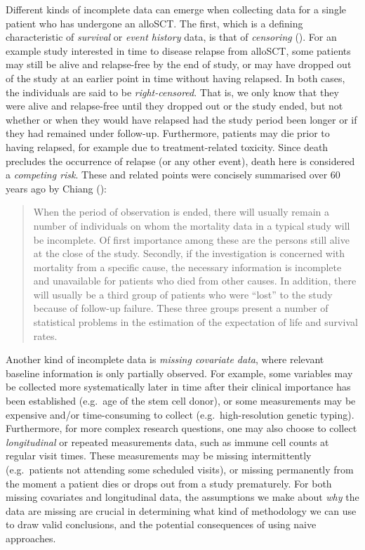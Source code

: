 \documentclass[
  letterpaper,
  DIV=11,
  numbers=noendperiod]{scrreprt}
\begin{document}
Different kinds of incomplete data can emerge when collecting data for a
single patient who has undergone an alloSCT. The first, which is a
defining characteristic of \emph{survival} or \emph{event history} data,
is that of \emph{censoring} (). For an example study interested in time to disease relapse
from alloSCT, some patients may still be alive and relapse-free by the
end of study, or may have dropped out of the study at an earlier point
in time without having relapsed. In both cases, the individuals are said
to be \emph{right-censored}. That is, we only know that they were alive
and relapse-free until they dropped out or the study ended, but not
whether or when they would have relapsed had the study period been
longer or if they had remained under follow-up. Furthermore, patients
may die prior to having relapsed, for example due to treatment-related
toxicity. Since death precludes the occurrence of relapse (or any other
event), death here is considered a \emph{competing risk}. These and
related points were concisely summarised over 60 years ago by Chiang
():

\begin{quote}
When the period of observation is ended, there will usually remain a
number of individuals on whom the mortality data in a typical study will
be incomplete. Of first importance among these are the persons still
alive at the close of the study. Secondly, if the investigation is
concerned with mortality from a specific cause, the necessary
information is incomplete and unavailable for patients who died from
other causes. In addition, there will usually be a third group of
patients who were ``lost'' to the study because of follow-up failure.
These three groups present a number of statistical problems in the
estimation of the expectation of life and survival rates.
\end{quote}

Another kind of incomplete data is \emph{missing covariate data}, where
relevant baseline information is only partially observed. For example,
some variables may be collected more systematically later in time after
their clinical importance has been established (e.g.~age of the stem
cell donor), or some measurements may be expensive and/or time-consuming
to collect (e.g.~high-resolution genetic typing). Furthermore, for more
complex research questions, one may also choose to collect
\emph{longitudinal} or repeated measurements data, such as immune cell
counts at regular visit times. These measurements may be missing
intermittently (e.g.~patients not attending some scheduled visits), or
missing permanently from the moment a patient dies or drops out from a
study prematurely. For both missing covariates and longitudinal data,
the assumptions we make about \emph{why} the data are missing are
crucial in determining what kind of methodology we can use to draw valid
conclusions, and the potential consequences of using naive approaches.
\end{document}
